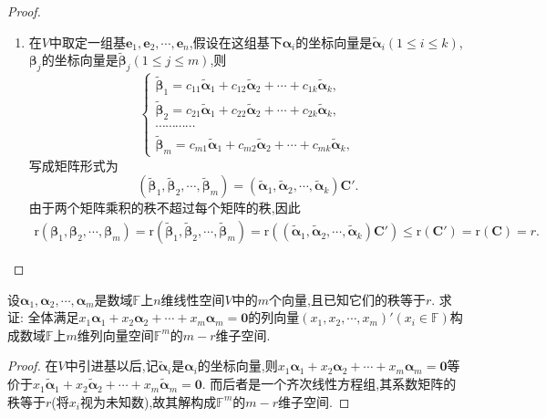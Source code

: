 \documentclass[lang=cn,newtx,10pt,scheme=chinese]{elegantbook}
\begin{document}
\begin{proof}
\begin{enumerate}[(1)]
\item 在\(V\)中取定一组基\(\boldsymbol{e}_1,\boldsymbol{e}_2,\cdots,\boldsymbol{e}_n\),假设在这组基下\(\boldsymbol{\alpha}_i\)的坐标向量是\(\widetilde{\boldsymbol{\alpha}}_i(1\leq i\leq k)\),\(\boldsymbol{\beta}_j\)的坐标向量是\(\widetilde{\boldsymbol{\beta}}_j(1\leq j\leq m)\),则
\[
\begin{cases}
\widetilde{\boldsymbol{\beta}}_1 = c_{11}\widetilde{\boldsymbol{\alpha}}_1 + c_{12}\widetilde{\boldsymbol{\alpha}}_2+\cdots + c_{1k}\widetilde{\boldsymbol{\alpha}}_k,\\
\widetilde{\boldsymbol{\beta}}_2 = c_{21}\widetilde{\boldsymbol{\alpha}}_1 + c_{22}\widetilde{\boldsymbol{\alpha}}_2+\cdots + c_{2k}\widetilde{\boldsymbol{\alpha}}_k,\\
\cdots\cdots\cdots\cdots\\
\widetilde{\boldsymbol{\beta}}_m = c_{m1}\widetilde{\boldsymbol{\alpha}}_1 + c_{m2}\widetilde{\boldsymbol{\alpha}}_2+\cdots + c_{mk}\widetilde{\boldsymbol{\alpha}}_k,
\end{cases}
\]
写成矩阵形式为
\[
(\widetilde{\boldsymbol{\beta}}_1,\widetilde{\boldsymbol{\beta}}_2,\cdots,\widetilde{\boldsymbol{\beta}}_m)=(\widetilde{\boldsymbol{\alpha}}_1,\widetilde{\boldsymbol{\alpha}}_2,\cdots,\widetilde{\boldsymbol{\alpha}}_k)\boldsymbol{C}'.
\]
由于两个矩阵乘积的秩不超过每个矩阵的秩,因此
\begin{align*}
\mathrm{r}\left( \boldsymbol{\beta }_1,\boldsymbol{\beta }_2,\cdots ,\boldsymbol{\beta }_m \right) =\mathrm{r}\left( \widetilde{\boldsymbol{\beta }}_1,\widetilde{\boldsymbol{\beta }}_2,\cdots ,\widetilde{\boldsymbol{\beta }}_m \right) =\mathrm{r}\left( \left( \widetilde{\boldsymbol{\alpha }}_1,\widetilde{\boldsymbol{\alpha }}_2,\cdots ,\widetilde{\boldsymbol{\alpha }}_k \right) \boldsymbol{C}' \right) \leqslant \mathrm{r}\left( \boldsymbol{C}'\right) =\mathrm{r}\left( \boldsymbol{C} \right) =r.
\end{align*}
\end{enumerate}
\end{proof}

\begin{proposition}\label{proposition:向量方程的解空间}
设\(\boldsymbol{\alpha}_1,\boldsymbol{\alpha}_2,\cdots,\boldsymbol{\alpha}_m\)是数域\(\mathbb{F}\)上\(n\)维线性空间\(V\)中的\(m\)个向量,且已知它们的秩等于\(r\). 求证: 全体满足\(x_1\boldsymbol{\alpha}_1 + x_2\boldsymbol{\alpha}_2+\cdots + x_m\boldsymbol{\alpha}_m = \boldsymbol{0}\)的列向量\((x_1,x_2,\cdots,x_m)'(x_i\in\mathbb{F})\)构成数域\(\mathbb{F}\)上\(m\)维列向量空间\(\mathbb{F}^m\)的\(m - r\)维子空间.
\end{proposition}
\begin{proof}
在\(V\)中引进基以后,记\(\widetilde{\boldsymbol{\alpha}}_i\)是\(\boldsymbol{\alpha}_i\)的坐标向量,则\(x_1\boldsymbol{\alpha}_1 + x_2\boldsymbol{\alpha}_2+\cdots + x_m\boldsymbol{\alpha}_m = \boldsymbol{0}\)等价于\(x_1\widetilde{\boldsymbol{\alpha}}_1 + x_2\widetilde{\boldsymbol{\alpha}}_2+\cdots + x_m\widetilde{\boldsymbol{\alpha}}_m = \boldsymbol{0}\). 而后者是一个齐次线性方程组,其系数矩阵的秩等于\(r\)(将\(x_i\)视为未知数),故其解构成\(\mathbb{F}^m\)的\(m - r\)维子空间.
\end{proof}
\end{document}
